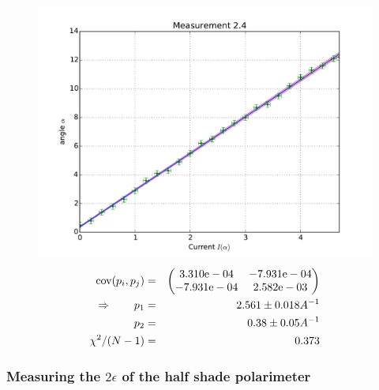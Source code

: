 \begin{figure}
    \begin{centering}
        \includegraphics[width=18cm]{figures/fig24}
\captionsetup{singlelinecheck=off} 
\caption[.]{
\begin{eqnarray*}
    \mathrm{cov}(p_i, p_j) &=& 
    \begin{pmatrix}
        3.310\mathrm{e}-04 &-7.931\mathrm{e}-04 \\
        -7.931\mathrm{e}-04 &2.582\mathrm{e}-03 \\
    \end{pmatrix}
\\ \Rightarrow \qquad
    p_1 &=& 2.561 \pm 0.018 A^{-1}\\
    p_2 &=& 0.38 \pm 0.05 A^{-1} \\
    \chi ^2/(N-1) &=&  0.373
\end{eqnarray*}
}
    \end{centering}
\end{figure}
\subsubsection{Measuring the $2\epsilon$ of the half shade polarimeter}


